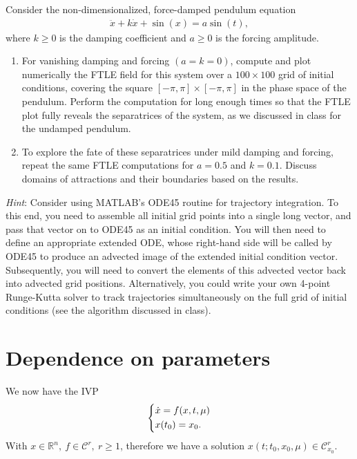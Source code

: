 \begin{exercise}
Consider the non-dimensionalized, force-damped pendulum equation
\begin{align}
	\ddot{x} + k\dot{x} + \sin(x) = a\sin(t),
\end{align}
where $k \geq 0$ is the damping coefficient and $a \geq 0$ is the forcing amplitude.

\begin{enumerate}[label=(\alph*)]
	\item For vanishing damping and forcing $(a=k=0)$, compute and plot numerically the FTLE field for this system over a $100 \times 100$ grid of initial conditions, covering the square $[- \pi, \pi] \times [-\pi, \pi]$ in the phase space of the pendulum. Perform the computation for long enough times so that the FTLE plot fully reveals the separatrices of the system, as we discussed in class for the undamped pendulum.
	\item To explore the fate of these separatrices under mild damping and forcing, repeat the same FTLE computations for $a = 0.5$ and $k = 0.1$. Discuss domains of attractions and their boundaries based on the results.
\end{enumerate}

\textit{Hint}: Consider using MATLAB’s ODE45 routine for trajectory integration. To this end, you need to assemble all initial grid points into a single long vector, and pass that vector on to ODE45 as an initial condition. You will then need to define an appropriate extended ODE, whose right-hand side will be called by ODE45 to produce an advected image of the extended initial condition vector. Subsequently, you will need to convert the elements of this advected vector back into advected grid positions.
Alternatively, you could write your own 4-point Runge-Kutta solver to track trajectories simultaneously on the full grid of initial conditions (see the algorithm discussed in class).

\end{exercise}



\section{Dependence on parameters}
We now have the IVP
\begin{align}
\label{eq:ivp_mu}
	\begin{dcases}
		\dot{ {x}} = f( {x},t, {\mu} ) \\  {x}(t_0) =  {x}_0.
	\end{dcases}
\end{align}
With $ {x} \in \mathbb{R}^{n},\ f\in \mathcal{C}^r,\ r\geq 1$, therefore we have a solution $ {x}(t; t_0,  {x}_0,  {\mu} ) \in \mathcal{C}^r_{ {x}_0}$.

